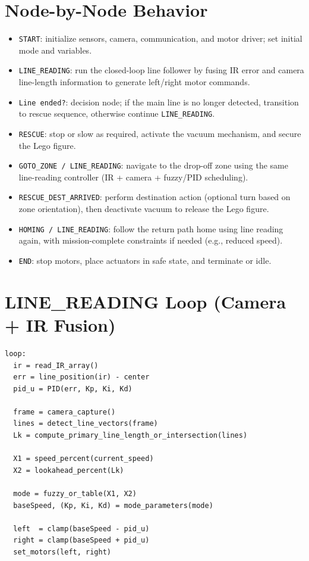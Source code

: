 \documentclass{article}
\begin{document}
\section{Node-by-Node Behavior}
\begin{itemize}
\item \texttt{START}: initialize sensors, camera, communication, and motor driver; set initial mode and variables.
\item \texttt{LINE\_READING}: run the closed-loop line follower by fusing IR error and camera line-length information to generate left/right motor commands.
\item \texttt{Line ended?}: decision node; if the main line is no longer detected, transition to rescue sequence, otherwise continue \texttt{LINE\_READING}.
\item \texttt{RESCUE}: stop or slow as required, activate the vacuum mechanism, and secure the Lego figure.
\item \texttt{GOTO\_ZONE / LINE\_READING}: navigate to the drop-off zone using the same line-reading controller (IR + camera + fuzzy/PID scheduling).
\item \texttt{RESCUE\_DEST\_ARRIVED}: perform destination action (optional turn based on zone orientation), then deactivate vacuum to release the Lego figure.
\item \texttt{HOMING / LINE\_READING}: follow the return path home using line reading again, with mission-complete constraints if needed (e.g., reduced speed).
\item \texttt{END}: stop motors, place actuators in safe state, and terminate or idle.
\end{itemize}

\section{LINE\_READING Loop (Camera + IR Fusion)}
\begin{verbatim}
loop:
  ir = read_IR_array()
  err = line_position(ir) - center
  pid_u = PID(err, Kp, Ki, Kd)

  frame = camera_capture()
  lines = detect_line_vectors(frame)
  Lk = compute_primary_line_length_or_intersection(lines)

  X1 = speed_percent(current_speed)
  X2 = lookahead_percent(Lk)

  mode = fuzzy_or_table(X1, X2)
  baseSpeed, (Kp, Ki, Kd) = mode_parameters(mode)

  left  = clamp(baseSpeed - pid_u)
  right = clamp(baseSpeed + pid_u)
  set_motors(left, right)
\end{verbatim}
\end{document}
